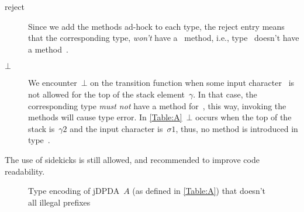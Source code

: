 \begin{description}
 \item[\textsf{reject}] Since we add the methods ad-hock to each type, the reject entry means
   that the corresponding type, \emph{won't} have a~\cc{\$()} method, i.e., type~
   doesn't have a method~\cc{\$()}.
 \item[$⊥$] We encounter~$⊥$ on the transition function when some input character~
   is not allowed for the top of the stack element~$γ$. In that case, the corresponding type 
   \emph{must not} have a method for~, this way, invoking the methods will cause type error.
   In \cref{Table:A}~$⊥$ occurs when the top of the stack is~$γ{}2$ and the input character is~$σ{}1$,
   thus, no method  is introduced in type~.
\end{description}

The use of sidekicks is still allowed, and recommended to improve code readability.

\begin{figure}[htbp]
  \caption{\label{Figure:prefix-A}Type encoding of jDPDA~$A$ (as defined in \cref{Table:A})
    that doesn't all illegal prefixes}
\end{figure}
